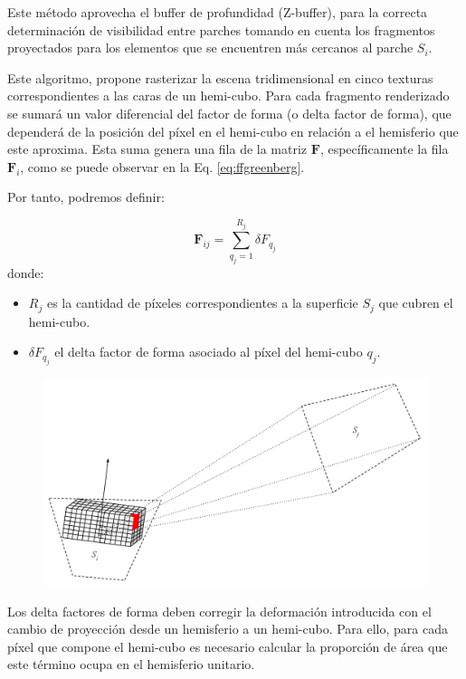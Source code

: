 Este método aprovecha el buffer de profundidad (Z-buffer), para la correcta determinación de visibilidad entre parches tomando en cuenta los fragmentos proyectados para los elementos que se encuentren más cercanos al parche $S_{i}$.

Este algoritmo, propone rasterizar la escena tridimensional en cinco texturas correspondientes a las caras de un hemi-cubo. Para cada fragmento renderizado se sumará un valor diferencial del factor de forma (o delta factor de forma), que dependerá de la posición del píxel en el hemi-cubo en relación a el hemisferio que este aproxima.  Esta suma genera una fila de la matriz $\mathbf{F}$, específicamente la fila $\mathbf{F}_{i}$, como se puede observar en la Eq. \eqref{eq:ffgreenberg}.

Por tanto, podremos definir:

\begin{equation}
	\mathbf{F}_{ij} = \sum_{q_{j}=1}^{R_{j}} \delta{F_{q_{j}}}
	\label{eq:ffgreenberg}
\end{equation}
donde:
\begin{itemize}
	\item $R_{j}$ es la cantidad de píxeles correspondientes a la superficie $S_{j}$ que cubren el hemi-cubo.
	\item $\delta{F_{q_{j}}}$ el delta factor de forma asociado al píxel del hemi-cubo $q_{j}$.
\end{itemize}

\vspace{5mm}
\begin{figure}[htbp]
	\centering
	\includegraphics[width=0.8\linewidth]{assets/Hemicube}
	\label{img:ff3}
\end{figure}

Los delta factores de forma deben corregir la deformación introducida con el cambio de proyección desde un hemisferio a un hemi-cubo. Para ello, para cada píxel que compone el hemi-cubo es necesario calcular la proporción de área que este término ocupa en el hemisferio unitario.

